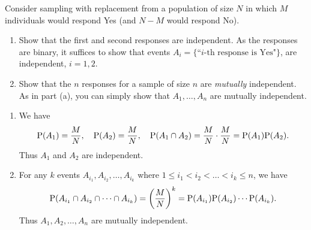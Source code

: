 \documentclass[12pt]{article}
\newcommand{\Prob}{{\rm P}}
\newenvironment{problem}[2][Problem]{\begin{trivlist}
\item[\hskip \labelsep {\bfseries #1}\hskip \labelsep {\bfseries #2.}]}
{\end{trivlist}}
\begin{document}
\begin{problem}{4}
  Consider sampling with replacement from a population of size $N$ in which
  $M$ individuals would respond Yes (and $N-M$ would respond No).
  \begin{enumerate}
    \item Show that the first and second responses are independent. 
    As the responses are binary, it suffices to show that events
    $A_i = \{\text{``$i$-th response is Yes"}\}$, are independent, $i=1,2$.
    \item Show that the $n$ responses for a sample of size $n$ are
    \textit{mutually} independent. As in part (a), you can simply show that
    $A_1,\dots,A_n$ are mutually independent.
  \end{enumerate}
  \begin{enumerate}
    \item We have
    \[
      \Prob(A_1) = \frac{M}{N}, \quad \Prob(A_2) = \frac{M}{N}, \quad
      \Prob(A_1 \cap A_2) = \frac{M}{N} \cdot \frac{M}{N} = \Prob(A_1)\Prob(A_2).
    \]
    Thus $A_1$ and $A_2$ are independent.
    \item For any $k$ events $A_{i_1}, A_{i_2}, \dots, A_{i_k}$ where
    $1 \leq i_1 < i_2 < \dots < i_k \leq n$, we have
    \[
      \Prob(A_{i_1} \cap A_{i_2} \cap \dots \cap A_{i_k})
      = \left(\frac{M}{N}\right)^k
      = \Prob(A_{i_1})\Prob(A_{i_2})\cdots\Prob(A_{i_k}).
    \]
    Thus $A_1, A_2, \dots, A_n$ are mutually independent.
  \end{enumerate}
\end{problem}
\end{document}

